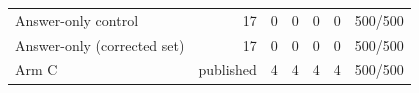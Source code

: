 \begin{table}[t]
{\begin{tabular}{lrrrrrr}
Answer-only control & 17 & 0 & 0 & 0 & 0 & 500/500 \\
Answer-only (corrected set) & 17 & 0 & 0 & 0 & 0 & 500/500 \\
Arm C & published & 4 & 4 & 4 & 4 & 500/500 \\

\end{tabular}}
\end{table}
